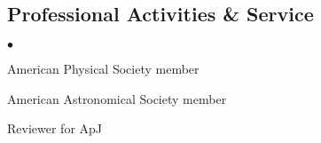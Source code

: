 \documentclass[margin,line]{res}
\newenvironment{list2}{
  \begin{list}{$\bullet$}{%
      \setlength{\itemsep}{0in}
      \setlength{\parsep}{0in} \setlength{\parskip}{0in}
      \setlength{\topsep}{0in} \setlength{\partopsep}{0in} 
      \setlength{\leftmargin}{0.2in}}}{\end{list}}
\begin{document}
\begin{resume}
%
%
%

\section{\sc Professional Activities \& Service}
\begin{list2}
\item[] American Physical Society member
\item[] American Astronomical Society member
\item[] Reviewer for ApJ
\end{list2}


\end{resume}
\end{document}
